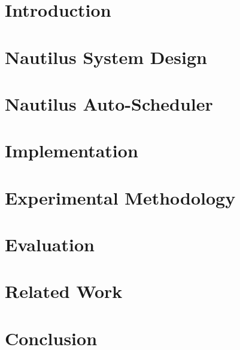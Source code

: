 \documentclass{article}
\newcommand{\NA}[1]{{\color{blue} #1}}
\newcommand{\NA}[1]{#1}
\def\NAME{Nautilus}
\begin{document}
\section{Introduction}
{}

\section{\NAME{} System Design}
\label{sec:design}
{}


\section{\NAME{} Auto-Scheduler}
\label{sec:auto-sched}
{}

\vspace{-.08in}
\section{Implementation}
\label{sec:impl}
{}

\section{Experimental Methodology}
\label{sec:method}
{}

\section{Evaluation}
\label{sec:eval}
{}

\section{\NA{Related Work}}
\label{sec:rw}
{}

\section{\NA{Conclusion}}
\label{sec:conclusion}
{}




\clearpage
\onecolumn
\appendix
\label{app}
\clearpage

\end{document}
